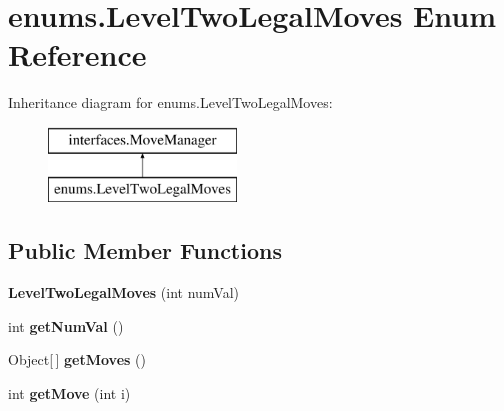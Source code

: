 \hypertarget{enumenums_1_1_level_two_legal_moves}{\section{enums.\-Level\-Two\-Legal\-Moves Enum Reference}
\label{enumenums_1_1_level_two_legal_moves}
}
Inheritance diagram for enums.\-Level\-Two\-Legal\-Moves\-:\begin{figure}[H]
\begin{center}
\leavevmode
\includegraphics[height=2.000000cm]{enumenums_1_1_level_two_legal_moves}
\end{center}
\end{figure}
\subsection*{Public Member Functions}
\begin{DoxyCompactItemize}
\item 
\hypertarget{enumenums_1_1_level_two_legal_moves_a297e43b0a74c06d61190888f0b586c4b}{{\bfseries Level\-Two\-Legal\-Moves} (int num\-Val)}\label{enumenums_1_1_level_two_legal_moves_a297e43b0a74c06d61190888f0b586c4b}

\item 
\hypertarget{enumenums_1_1_level_two_legal_moves_a3e5d74dd69815fd95ee85a20b04cd496}{int {\bfseries get\-Num\-Val} ()}\label{enumenums_1_1_level_two_legal_moves_a3e5d74dd69815fd95ee85a20b04cd496}

\item 
\hypertarget{enumenums_1_1_level_two_legal_moves_a4ae06505622912eda8fb509af36a13b9}{Object\mbox{[}$\,$\mbox{]} {\bfseries get\-Moves} ()}\label{enumenums_1_1_level_two_legal_moves_a4ae06505622912eda8fb509af36a13b9}

\item 
\hypertarget{enumenums_1_1_level_two_legal_moves_a7e1c1ac70fd86df33d1e578335ac31ca}{int {\bfseries get\-Move} (int i)}\label{enumenums_1_1_level_two_legal_moves_a7e1c1ac70fd86df33d1e578335ac31ca}

\end{DoxyCompactItemize}
